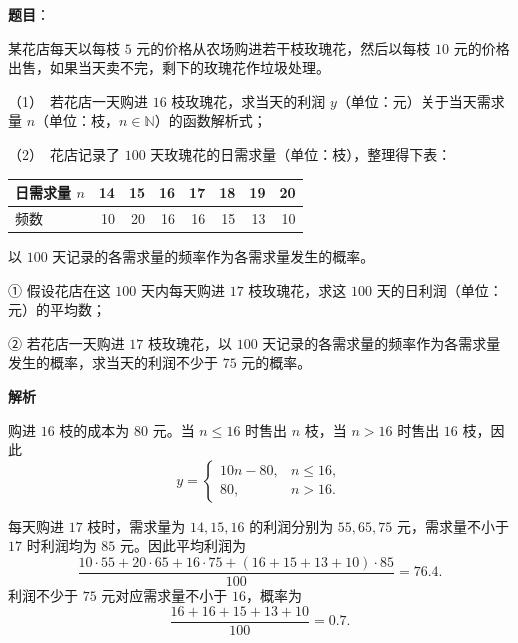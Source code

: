 \begin{answer}

\textbf{题目}：

某花店每天以每枝 $5$ 元的价格从农场购进若干枝玫瑰花，然后以每枝 $10$ 元的价格出售，如果当天卖不完，剩下的玫瑰花作垃圾处理。

（1）　若花店一天购进 $16$ 枝玫瑰花，求当天的利润 $y$（单位：元）关于当天需求量 $n$（单位：枝，$n\in\mathbb N$）的函数解析式；

（2）　花店记录了 $100$ 天玫瑰花的日需求量（单位：枝），整理得下表：

\begin{center}
\begingroup\setlength{\tabcolsep}{4pt}
\begin{tabular}{lrrrrrrr}
\toprule
日需求量 $n$ & 14 & 15 & 16 & 17 & 18 & 19 & 20 \\
\midrule
频数 & 10 & 20 & 16 & 16 & 15 & 13 & 10 \\
\bottomrule
\end{tabular}
\endgroup
\end{center}

以 $100$ 天记录的各需求量的频率作为各需求量发生的概率。

① 假设花店在这 $100$ 天内每天购进 $17$ 枝玫瑰花，求这 $100$ 天的日利润（单位：元）的平均数；

② 若花店一天购进 $17$ 枝玫瑰花，以 $100$ 天记录的各需求量的频率作为各需求量发生的概率，求当天的利润不少于 $75$ 元的概率。

\textbf{解析}


购进 $16$ 枝的成本为 $80$ 元。当 $n\leqslant16$ 时售出 $n$ 枝，当 $n>16$ 时售出 $16$ 枝，因此
\nopagebreak[4]
\[
y=\begin{cases}10n-80,&n\leqslant16,\\80,&n>16.\end{cases}
\]


每天购进 $17$ 枝时，需求量为 $14,15,16$ 的利润分别为 $55,65,75$ 元，需求量不小于 $17$ 时利润均为 $85$ 元。因此平均利润为
\nopagebreak[4]
\[
\frac{10\cdot55+20\cdot65+16\cdot75+(16+15+13+10)\cdot85}{100}=76.4.
\]
利润不少于 $75$ 元对应需求量不小于 $16$，概率为
\nopagebreak[4]
\[
\frac{16+16+15+13+10}{100}=0.7.
\]



\end{answer}
